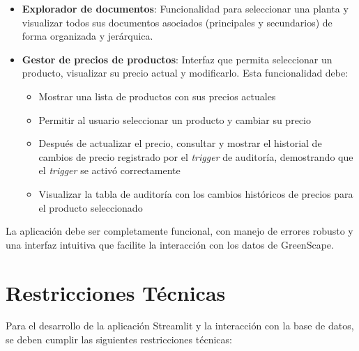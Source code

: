 \documentclass[10pt]{article}
\begin{document}
\begin{enumerate}
\begin{itemize}
			\item \textbf{Explorador de documentos}: Funcionalidad para seleccionar una planta y visualizar todos sus documentos asociados (principales y secundarios) de forma organizada y jerárquica.
			
			\item \textbf{Gestor de precios de productos}: Interfaz que permita seleccionar un producto, visualizar su precio actual y modificarlo. Esta funcionalidad debe:
			\begin{itemize}
				\item Mostrar una lista de productos con sus precios actuales
				\item Permitir al usuario seleccionar un producto y cambiar su precio
				\item Después de actualizar el precio, consultar y mostrar el historial de cambios de precio registrado por el \emph{trigger} de auditoría, demostrando que el \emph{trigger} se activó correctamente
				\item Visualizar la tabla de auditoría con los cambios históricos de precios para el producto seleccionado
			\end{itemize}
		\end{itemize}
		
		La aplicación debe ser completamente funcional, con manejo de errores robusto y una interfaz intuitiva que facilite la interacción con los datos de GreenScape.
		
	\end{enumerate}
	
	\section*{Restricciones Técnicas}
	
	Para el desarrollo de la aplicación Streamlit y la interacción con la base de datos, se deben cumplir las siguientes restricciones técnicas:
	
\end{document}
